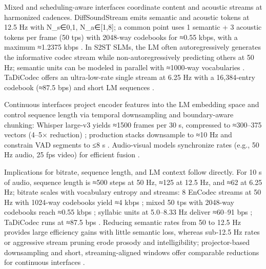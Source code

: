 Mixed and scheduling-aware interfaces coordinate content and acoustic streams at harmonized cadences. DiffSoundStream emits semantic and acoustic tokens at 12.5 Hz with N_s∈{0,1}, N_a∈[1,8]; a common point uses 1 semantic + 3 acoustic tokens per frame (50 tps) with 2048-way codebooks for ≈0.55 kbps, with a maximum ≈1.2375 kbps \cite{yang2025diffsoundstreamefficientspeechtokenizati}. In S2ST SLMs, the LM often autoregressively generates the informative codec stream while non-autoregressively predicting others at 50 Hz; semantic units can be modeled in parallel with ≈1000‑way vocabularies \cite{peng2024mslms2stmultitaskspeechlanguagemodeltext}. TaDiCodec offers an ultra‑low‑rate single stream at 6.25 Hz with a 16,384-entry codebook (≈87.5 bps) and short LM sequences \cite{wang2025tadicodectextawarediffusionspeechtokeniz}.

Continuous interfaces project encoder features into the LM embedding space and control sequence length via temporal downsampling and boundary-aware chunking: Whisper large‑v3 yields ≈1500 frames per 30 s, compressed to ≈300–375 vectors (4–5× reduction) \cite{nguyen2025qwenvsgemmaintegrationwhispercomparative}; production stacks downsample to ≈10 Hz and constrain VAD segments to ≤8 s \cite{li2025seewossubmissionmlcslmlessonslearnedspee}. Audio‑visual models synchronize rates (e.g., 50 Hz audio, 25 fps video) for efficient fusion \cite{sadok2025vectorquantizedmaskedautoencoderaudiovis}.

Implications for bitrate, sequence length, and LM context follow directly. For 10 s of audio, sequence length is ≈500 steps at 50 Hz, ≈125 at 12.5 Hz, and ≈62 at 6.25 Hz; bitrate scales with vocabulary entropy and streams: 8 EnCodec streams at 50 Hz with 1024-way codebooks yield ≈4 kbps \cite{peng2024mslms2stmultitaskspeechlanguagemodeltext}; mixed 50 tps with 2048-way codebooks reach ≈0.55 kbps \cite{yang2025diffsoundstreamefficientspeechtokenizati}; syllabic units at 5.0–8.33 Hz deliver ≈60–91 bps \cite{baade2024syllablelmlearningcoarsesemanticunitsspe}; TaDiCodec runs at ≈87.5 bps \cite{wang2025tadicodectextawarediffusionspeechtokeniz}. Reducing semantic rates from 50 to 12.5 Hz provides large efficiency gains with little semantic loss, whereas sub‑12.5 Hz rates or aggressive stream pruning erode prosody and intelligibility; projector-based downsampling and short, streaming-aligned windows offer comparable reductions for continuous interfaces \cite{zeng2024scalingspeechtextpretrainingsyntheticint,nguyen2025qwenvsgemmaintegrationwhispercomparative,li2025seewossubmissionmlcslmlessonslearnedspee}.

